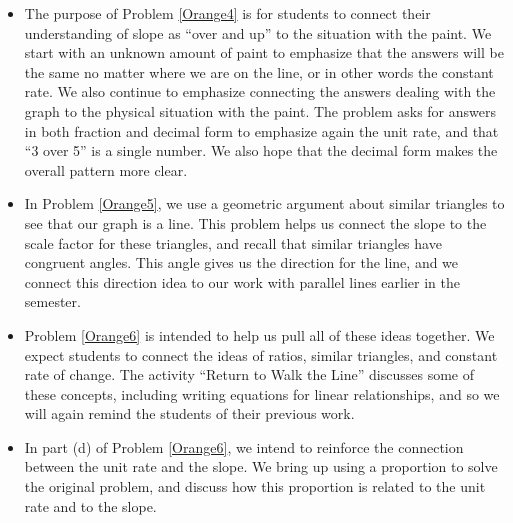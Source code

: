 \documentclass[nooutcomes]{ximera}
\begin{document}
\begin{instructorNotes}
\begin{itemize}
    \item The purpose of Problem \ref{Orange4} is for students to connect their understanding of slope as ``over and up'' to the situation with the paint.  We start with an unknown amount of paint to emphasize that the answers will be the same no matter where we are on the line, or in other words the constant rate.  We also continue to emphasize connecting the answers dealing with the graph to the physical situation with the paint.  The problem asks for answers in both fraction and decimal form to emphasize again the unit rate, and that ``3 over 5'' is a single number.  We also hope that the decimal form makes the overall pattern more clear.
    \item In Problem \ref{Orange5}, we use a geometric argument about similar triangles to see that our graph is a line.  This problem helps us connect the slope to the scale factor for these triangles, and recall that similar triangles have congruent angles.  This angle gives us the direction for the line, and we connect this direction idea to our work with parallel lines earlier in the semester.
    \item Problem \ref{Orange6} is intended to help us pull all of these ideas together.  We expect students to connect the ideas of ratios, similar triangles, and constant rate of change.  The activity ``Return to Walk the Line'' discusses some of these concepts, including writing equations for linear relationships, and so we will again remind the students of their previous work.
    \item In part (d) of Problem \ref{Orange6}, we intend to reinforce the connection between the unit rate and the slope. We bring up using a proportion to solve the original problem, and discuss how this proportion is related to the unit rate and to the slope.
\end{itemize}



\end{instructorNotes}
\end{document}
